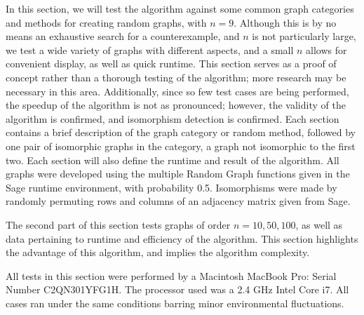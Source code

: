 \documentclass[12pt]{article}
\begin{document}
In this section, we will test the algorithm against some common graph categories and methods for creating random graphs, with $n = 9$. Although this is by no means an exhaustive search for a counterexample, and $n$ is not particularly large, we test a wide variety of graphs with different aspects, and a small $n$ allows for convenient display, as well as quick runtime. This section serves as a proof of concept rather than a thorough testing of the algorithm; more research may be necessary in this area. Additionally, since so few test cases are being performed, the speedup of the algorithm is not as pronounced; however, the validity of the algorithm is confirmed, and isomorphism detection is confirmed. Each section contains a brief description of the graph category or random method, followed by one pair of isomorphic graphs in the category, a graph not isomorphic to the first two. Each section will also define the runtime and result of the algorithm. All graphs were developed using the multiple Random Graph functions given in the Sage runtime environment, with probability 0.5. Isomorphisms were made by randomly permuting rows and columns of an adjacency matrix given from Sage.

The second part of this section tests graphs of order $n=10,50,100$, as well as data pertaining to runtime and efficiency of the algorithm. This section highlights the advantage of this algorithm, and implies the algorithm complexity.

All tests in this section were performed by a Macintosh MacBook Pro: Serial Number C2QN301YFG1H. The processor used was a 2.4 GHz Intel Core i7. All cases ran under the same conditions barring minor environmental fluctuations.

\newpage
\end{document}
